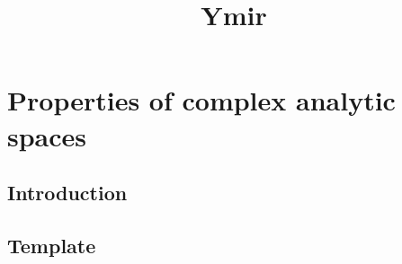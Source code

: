 
\title{Ymir}

\maketitle
\tableofcontents

\chapter*{Properties of complex analytic spaces}

\section{Introduction}\label{sec-introduction-propertycomplex}

\section{Template}







\cite{stacks-project}

\printbibliography
